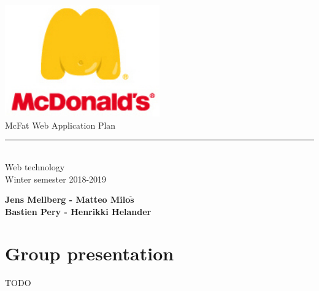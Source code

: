 \documentclass[12pt]{article}
\begin{document}
\begin{titlepage}
        \begin{center}
            \includegraphics[width=0.5\textwidth]{./Pictures/mcdonalds-fat-logo.jpg}\\
            \vspace{1cm}
            \Large McFat Web Application Plan\\
            \rule{5cm}{.5pt}\\
            \vspace{0.6cm}
            {\Large Web technology}\\
            \vspace{0.1cm}
            {\Large Winter semester 2018-2019} \\
            \vspace{3em}

            \textbf{Jens Mellberg - Matteo Milo$\mathbf{\check{s}}$}\\
            \textbf{Bastien Pery - Henrikki Helander}
        \end{center}

    \end{titlepage}

    \renewcommand{\contentsname}{\color{color_section}\\Table of contents}
    \tableofcontents

    \newpage

    {\color{color_section}\section{Group presentation}}
        TODO
\end{document}
